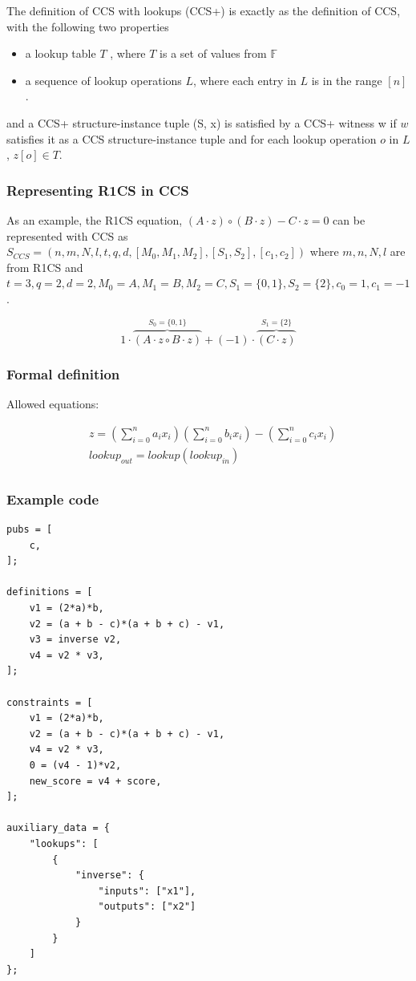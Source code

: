 \documentclass[
    9pt,            %
    techreport,        %
    affiltop,       %
]{art}
\begin{document}
The definition of CCS with lookups (CCS+) is exactly as the definition of CCS, with the following two properties
\begin{itemize}
    \item a lookup table $T$ , where $T$ is a set of values from $\mathbb{F}$
    \item a sequence of lookup operations $L$, where each entry in $L$ is in the range $[n]$.
\end{itemize}

and a CCS+ structure-instance tuple (S, x) is satisfied by a CCS+ witness w if $w$ satisfies it as a CCS structure-instance tuple and for each lookup operation $o$ in $L$, $z[o] \in T$.

\subsubsection{Representing R1CS in CCS}

As an example, the R1CS equation, $(A \cdot z) \circ (B \cdot z) - C \cdot z = 0$ can be represented with CCS as
$S_{CCS}=(n,m,N,l,t,q,d,[M_0, M_1, M_2], [S_1, S_2], [c_1, c_2])$ where $m, n, N, l$ are from R1CS and $t=3, q=2, d=2, M_0=A, M_1=B, M_2=C, S_1=\{0,1\}, S_2=\{2\}, c_0=1, c_1 = -1$.

\begin{equation*}
    1 \cdot \overbrace{(A \cdot z \circ B \cdot z)}^{S_0 = \{0,1\}} + (-1) \cdot \overbrace{(C \cdot z)}^{S_1=\{2\}}
\end{equation*}

\subsubsection{Formal definition}
Allowed equations:

\begin{align*}
  & \displaystyle z = \left(\sum_{i=0}^n a_i x_i\right)\left(\sum_{i=0}^n b_i x_i\right) - \left(\sum_{i=0}^n c_i x_i\right) \\
  & lookup_{out} = lookup(lookup_{in})\\ 
\end{align*}


\subsubsection{Example code}

\begin{verbatim}
pubs = [
    c,
];

definitions = [
    v1 = (2*a)*b,
    v2 = (a + b - c)*(a + b + c) - v1,
    v3 = inverse v2,
    v4 = v2 * v3,   
];

constraints = [
    v1 = (2*a)*b,
    v2 = (a + b - c)*(a + b + c) - v1,
    v4 = v2 * v3,
    0 = (v4 - 1)*v2,
    new_score = v4 + score,
];

auxiliary_data = {
    "lookups": [
        {
            "inverse": {
                "inputs": ["x1"],
                "outputs": ["x2"]
            }
        } 
    ] 
};
\end{verbatim}
\end{document}
